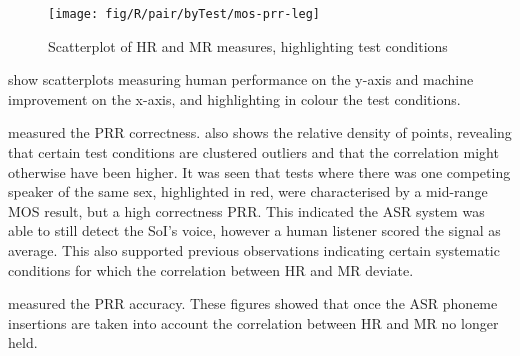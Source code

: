 \begin{figure}[h]


\noindent \begin{centering}
\texttt{[image: fig/R/pair/byTest/mos-prr-leg]}
\par\end{centering}

\protect\caption{\label{fig:hr-mr}Scatterplot of \acs{HR} and \acs{MR} measures,
highlighting test conditions}
\end{figure}


 show scatterplots measuring human performance on the
y-axis and machine improvement on the x-axis, and highlighting in
colour the test conditions.

 measured the \ac{PRR}
correctness.  also shows the relative density
of points, revealing that certain test conditions are clustered outliers
and that the correlation might otherwise have been higher. It was
seen that tests where there was one competing speaker of the same
sex, highlighted in red, were characterised by a mid-range \ac{MOS}
result, but a high correctness \ac{PRR}. This indicated the \ac{ASR}
system was able to still detect the \ac{SoI}'s voice, however a human
listener scored the signal as average. This also supported previous
observations indicating certain systematic conditions for which the
correlation between \ac{HR} and \ac{MR} deviate.

 measured the \ac{PRR} accuracy.
These figures showed that once the \ac{ASR} phoneme insertions are
taken into account the correlation between \ac{HR} and \ac{MR} no
longer held.

